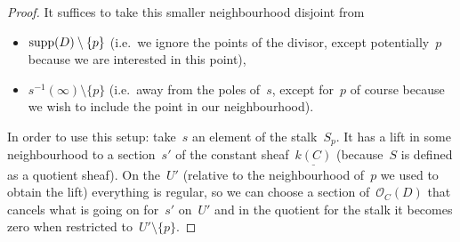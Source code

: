 \documentclass[10pt,a4paper]{article}
\begin{document}
\begin{proposition}
\begin{proof}
    It suffices to take this smaller neighbourhood disjoint from
    \begin{itemize}
      \item $\operatorname{supp}(D)\setminus\{p\}$ (i.e.\ we ignore the points of the divisor, except potentially~$p$ because we are interested in this point),
      \item $s^{-1}(\infty)\setminus\{p\}$ (i.e.\ away from the poles of~$s$, except for~$p$ of course because we wish to include the point in our neighbourhood).
    \end{itemize}

    In order to use this setup: take~$s$ an element of the stalk~$S_p$. It has a lift in some neighbourhood to a section~$s'$ of the constant sheaf~$\underline{k(C)}$ (because~$S$ is defined as a quotient sheaf). On the~$U'$ (relative to the neighbourhood of~$p$ we used to obtain the lift) everything is regular, so we can choose a section of~$\mathcal{O}_C(D)$ that cancels what is going on for~$s'$ on~$U'$ and in the quotient for the stalk it becomes zero when restricted to~$U'\setminus\{p\}$.
  \end{proof}
\end{proposition}
\end{document}
